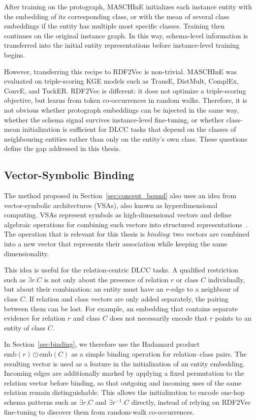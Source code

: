 \documentclass[a4paper,oneside,bibliography=totoc]{scrbook}
\begin{document}
After training on the protograph, MASCHInE initializes each instance entity
with the embedding of its corresponding class, or with the mean of several class
embeddings if the entity has multiple most specific classes. Training then
continues on the original instance graph. In this way, schema-level information
is transferred into the initial entity representations before instance-level
training begins.

However, transferring this recipe to RDF2Vec is non-trivial. MASCHInE was
evaluated on triple-scoring KGE models such as TransE, DistMult, ComplEx,
ConvE, and TuckER. RDF2Vec is different: it does not optimize a triple-scoring
objective, but learns from token co-occurrences in random walks. Therefore, it is
not obvious whether protograph embeddings can be injected in the same way,
whether the schema signal survives instance-level fine-tuning, or whether
class-mean initialization is sufficient for DLCC tasks that depend on the classes
of neighbouring entities rather than only on the entity's own class. These
questions define the gap addressed in this thesis.
\subsection{Vector-Symbolic Binding}
\label{sec:lit_vsa}

The method proposed in Section~\ref{sec:concept_bound} also uses an idea from
vector-symbolic architectures (VSAs), also known as hyperdimensional computing. VSAs represent
symbols as high-dimensional vectors and define algebraic operations for combining
such vectors into structured representations~\citep{kleyko_survey_2023}.
The operation that is relevant for this thesis is \emph{binding}: two vectors are
combined into a new vector that represents their association while keeping the
same dimensionality.

This idea is useful for the relation-centric DLCC tasks. A qualified restriction
such as $\exists r.C$ is not only about the presence of relation $r$ or class $C$
individually, but about their combination: an entity must have an $r$-edge to a
neighbour of class $C$. If relation and class vectors are only added separately,
the pairing between them can be lost. For example, an embedding that contains
separate evidence for relation $r$ and class $C$ does not necessarily encode that
$r$ points to an entity of class $C$.

In Section~\ref{sec:binding}, we therefore use the Hadamard product
$\mathrm{emb}(r) \odot \mathrm{emb}(C)$ as a simple binding operation for
relation--class pairs. The resulting vector is used as a feature in the
initialization of an entity embedding. Incoming edges are additionally marked by
applying a fixed permutation to the relation vector before binding, so that
outgoing and incoming uses of the same relation remain distinguishable. This
allows the initialization to encode one-hop schema patterns such as $\exists r.C$
and $\exists r^{-1}.C$ directly, instead of relying on RDF2Vec fine-tuning to
discover them from random-walk co-occurrences.
\end{document}
